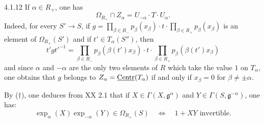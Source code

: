 \begin{remark}{4.1.12}\label{XXII.4.1.12}
If $\alpha\in R_+$, one has
\begin{equation}\tag{$\dagger$}\label{XXII.eq.dagger}
\Omega_{R_+}\cap Z_\alpha=U_{-\alpha}\cdot T\cdot U_\alpha.
\end{equation}
{\renewcommand{\thefootnote}{(18)}}%
Indeed, for every $S'\to S$, if $g=\prod_{\beta\in R_-}p_\beta(x_\beta)\cdot t\cdot\prod_{\beta\in R_+}p_\beta(x_\beta)$ is an element of $\Omega_{R_+}(S')$ and if $t'\in T_\alpha(S'')$, then
\[
t'gt'^{-1}=\prod_{\beta\in R_-}p_\beta(\beta(t')x_\beta)\cdot t\cdot\prod_{\beta\in R_+}p_\beta(\beta(t')x_\beta)
\]
and since $\alpha$ and $-\alpha$ are the only two elements of $R$ which take the value $1$ on $T_\alpha$, one obtains that $g$ belongs to $Z_\alpha=\underline{\mathrm{Centr}}(T_\alpha)$ if and only if $x_\beta=0$ for $\beta\ne\pm\alpha$.

By ($\dagger$), one deduces from XX 2.1 that if $X\in\Gamma(X,\mathfrak g^\alpha)$ and $Y\in\Gamma(S,\mathfrak g^{-\alpha})$, one has:
\[
\exp_\alpha(X)\exp_{-\alpha}(Y)\in\Omega_{R_+}(S)\quad\Longleftrightarrow\quad 1+XY\text{ invertible}.
\]
\end{remark}

